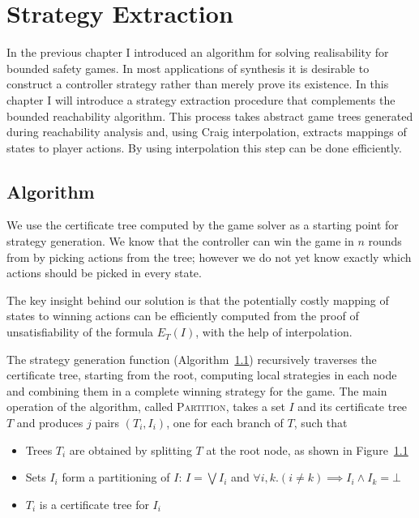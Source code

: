 \chapter{Strategy Extraction}
\label{ch:strategy}

\newcommand{\strategyext}[0]{\textsc{StrategyGen}\xspace}
\newcommand{\genstrategy}{\textsc{StrategyGen}}
\newcommand{\strategy}[0]{\textsc{Strategy}\xspace}
\newcommand{\partition}[0]{\textsc{Partition}\xspace}
\newcommand{\nextf}[0]{\textsc{Next}\xspace}
\newcommand{\ogametree}[0]{\mbox{\sc OppGT}}
\newcommand{\eagametree}[0]{\mbox{\sc AbsGT}'}
\newcommand{\pgametree}[0]{\mbox{\sc Cand}}
\newcommand{\apgametree}[0]{\mbox{\sc AbsSolvedGT}}
\newcommand{\opgametree}[0]{\mbox{\sc Spoiling}}

\renewcommand{\ss}[0]{\mathbf{s}}
\newcommand{\cc}[0]{\mathbf{c}}
\newcommand{\uu}[0]{\mathbf{u}}

\newtheorem{proposition}{Proposition}

In the previous chapter I introduced an algorithm for solving realisability for bounded safety games. In most applications of synthesis it is desirable to construct a controller strategy rather than merely prove its existence. In this chapter I will introduce a strategy extraction procedure that complements the bounded reachability algorithm. This process takes abstract game trees generated during reachability analysis and, using Craig interpolation, extracts mappings of states to player actions. By using interpolation this step can be done efficiently.

\section{Algorithm}

We use the certificate tree computed by the game solver as a
starting point for strategy generation.  We know that the
controller can win the game in $n$ rounds from by picking actions
from the tree; however we do not yet know exactly which actions
should be picked in every state.

The key insight behind our solution is that the potentially costly
mapping of states to winning actions can be efficiently computed
from the proof of unsatisfiability of the formula $E_T(I)$, with
the help of interpolation.

The strategy generation function (Algorithm~\ref{}) recursively traverses the
certificate tree, starting from the root, computing local strategies
in each node and combining them in a complete winning strategy for the
game.  The main operation of the algorithm, called \textsc{Partition},
takes a set $I$ and its certificate tree $T$ and produces $j$ pairs
$(T_i, I_i)$, one for each branch of $T$, such that
\begin{itemize}
    \item Trees $T_i$ are obtained by splitting $T$ at the root node, as shown in Figure~\ref{}
    \item Sets $I_i$ form a partitioning of $I$: $I=\bigvee I_i$ and $\forall i, k. (i\neq k) \implies I_i\land I_k=\bot$
    \item $T_i$ is a certificate tree for $I_i$
\end{itemize}

